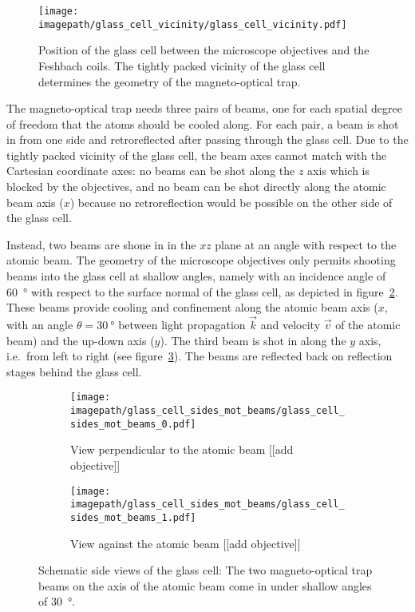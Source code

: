 \begin{figure}
    \centering
    \texttt{[image: \\imagepath/glass\_cell\_vicinity/glass\_cell\_vicinity.pdf]}
    \caption{Position of the glass cell between the microscope objectives and the Feshbach coils. The tightly packed vicinity of the glass cell determines the geometry of the magneto-optical trap.}\label{fig:glass_cell_vicinity}
\end{figure}

The magneto-optical trap needs three pairs of beams, one for each spatial degree of freedom that the atoms should be cooled along. For each pair, a beam is shot in from one side and retroreflected after passing through the glass cell. Due to the tightly packed vicinity of the glass cell, the beam axes cannot match with the Cartesian coordinate axes: no beams can be shot along the $z$ axis which is blocked by the objectives, and no beam can be shot directly along the atomic beam axis ($x$) because no retroreflection would be possible on the other side of the glass cell.

Instead, two beams are shone in in the $xz$ plane at an angle with respect to the atomic beam. The geometry of the microscope objectives only permits shooting beams into the glass cell at shallow angles, namely with an incidence angle of \SI{60}{\degree} with respect to the surface normal of the glass cell, as depicted in figure~\ref{fig:glass_cell_sides_mot_beams_0}. These beams provide cooling and confinement along the atomic beam axis ($x$, with an angle $\theta = \SI{30}{\degree}$ between light propagation $\vec k$ and velocity $\vec v$ of the atomic beam) and the up-down axis ($y$). The third beam is shot in along the $y$ axis, i.e.\ from left to right (see figure~\ref{fig:glass_cell_sides_mot_beams_1}). The beams are reflected back on reflection stages behind the glass cell.

\begin{figure}
    \centering
    \begin{subfigure}{0.49\textwidth}
        \centering
        \texttt{[image: \\imagepath/glass\_cell\_sides\_mot\_beams/glass\_cell\_sides\_mot\_beams\_0.pdf]}
        \caption{View perpendicular to the atomic beam [[add objective]]}\label{fig:glass_cell_sides_mot_beams_0}
    \end{subfigure}
    \begin{subfigure}{0.49\textwidth}
        \centering
        \texttt{[image: \\imagepath/glass\_cell\_sides\_mot\_beams/glass\_cell\_sides\_mot\_beams\_1.pdf]}
        \caption{View against the atomic beam [[add objective]]}\label{fig:glass_cell_sides_mot_beams_1}
    \end{subfigure}
    \caption{Schematic side views of the glass cell: The two magneto-optical trap beams on the axis of the atomic beam come in under shallow angles of \SI{30}{\degree}.
    }\label{fig:glass_cell_sides_mot_beams}
\end{figure} 

